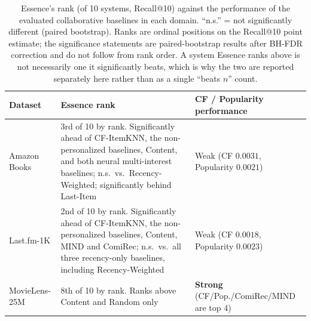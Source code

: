 \documentclass[11pt,a4paper]{article}
\begin{document}
\begin{table}[htbp]
\centering
\caption{Essence's rank (of 10 systems, Recall@10) against the performance
         of the evaluated collaborative baselines in each domain. ``n.s.''
         = not significantly different (paired bootstrap). Ranks are ordinal
         positions on the Recall@10 point estimate; the significance
         statements are paired-bootstrap results after BH-FDR correction and
         do not follow from rank order. A system Essence ranks above is not
         necessarily one it significantly beats, which is why the two are
         reported separately here rather than as a single ``beats $n$'' count.}
\label{tab:domain-dependence}
\begin{tabular}{@{}lp{6.5cm}p{4.7cm}@{}}
\toprule
\textbf{Dataset} & \textbf{Essence rank} & \textbf{CF / Popularity performance} \\
\midrule
Amazon Books    & 3rd of 10 by rank. Significantly ahead of CF-ItemKNN, the
                    non-personalized baselines, Content, and both neural
                    multi-interest baselines; n.s.\ vs.\ Recency-Weighted;
                    significantly behind Last-Item & Weak (CF $0.0031$, Popularity $0.0021$) \\
Last.fm-1K      & 2nd of 10 by rank. Significantly ahead of CF-ItemKNN, the
                    non-personalized baselines, Content, MIND and ComiRec;
                    n.s.\ vs.\ all three recency-only baselines, including
                    Recency-Weighted & Weak (CF $0.0018$, Popularity $0.0023$) \\
MovieLens-25M   & 8th of 10 by rank. Ranks above Content and Random only & \textbf{Strong} (CF/Pop./ComiRec/MIND are top 4) \\
\bottomrule
\end{tabular}
\end{table}
\end{document}
